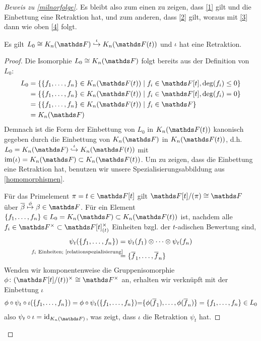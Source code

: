 \documentclass[ngerman,fontsize=11pt, paper=a4, parskip=half, titlepage=true, toc=bib]{scrartcl}
\begin{document}
\begin{proof}[Beweis zu \ref{milnorfolge}]
  Es bleibt also zum einen zu zeigen, dass \eqref{1} gilt und die Einbettung eine
  Retraktion hat, und zum anderen, dass \eqref{2} gilt, woraus mit \eqref{3} dann wie
  oben \eqref{4} folgt.
  
  \begin{Lem}
    Es gilt $L_0\cong \KnF\overset{\iota}{\hookrightarrow} \KnFt$
    und $\iota$ hat eine Retraktion.
    \begin{proof}
      Die Isomorphie $L_0\cong\KnF$ folgt bereits aus der Definition
      von $L_0$:
      \begin{align*}
        L_0
        &=\left\{\{f_1,\dotsc,f_n\}\in\KnFt 
          \mid f_i\in\F[t], \deg(f_i)\leq 0\right\}\\
        &=\left\{\{f_1,\dotsc,f_n\}\in\KnFt 
          \mid f_i\in\F[t], \deg(f_i)= 0\right\}\\
        &=\left\{\{f_1,\dotsc,f_n\}\in\KnFt 
          \mid f_i\in\F\right\}\\
        &=\KnF
      \end{align*}
      Demnach ist die Form der Einbettung von $L_0$ in $\KnFt$
      kanonisch gegeben durch die Einbettung von $\KnF$ in $\KnFt$, 
      d.h. $L_0=\KnF\overset{\iota}{\hookrightarrow}\KnFt$ 
      mit $\im(\iota)=\KnF\subset\KnFt$.
      Um zu zeigen, dass die Einbettung eine Retraktion hat,
      benutzen wir unsere Spezialisierungsabbildung aus 
      \ref{homomorphismen}.
      
      Für das Primelement $\pi=t\in\F[t]$ gilt $\F[t]/(\pi)\cong\F$
      über $\ov\beta\overset{\phi}{\mapsto}\beta\in\F$.
      Für ein Element $\{f_1,\dotsc, f_n\}\in L_0=\KnF\subset\KnFt$ ist,
      nachdem alle $f_i\in\Fx\subset\F[t]_{(t)}^\times$ Einheiten 
      bzgl. der $t$-adischen Bewertung sind,
      \begin{align*}
        \psi_t(\{f_1,\dotsc,f_n\})
        &={\psi_t(f_1)} \otimes\dotsb\otimes {\psi_t(f_n)}\\
        &\overset{\mathllap{\text{$f_i$ Einheiten; 
          \ref{relationspezialisierung}}}}{=}
          \{\ov f_1,\dotsc, \ov f_n\}
      \end{align*}
      Wenden wir komponentenweise die Gruppenisomorphie 
      $\phi\colon(\F[t]/(t))^\times\cong\Fx$ an, 
      erhalten wir verknüpft mit der Einbettung $\iota$
      \begin{align*}
        \phi\circ\psi_t\circ\iota(\{f_1,\dotsc,f_n\})
        =\phi\circ\psi_t(\{f_1,\dotsc,f_n\})
        {=}\{\phi(\overline f_1),\dotsc, \phi(\overline f_n)\}
        =\{f_1,\dotsc,f_n\}\in L_0
      \end{align*}
      also $\psi_t\circ \iota=\id_{\KnF}$, was zeigt, dass
      $\iota$ die Retraktion $\psi_t$ hat.
    \end{proof}
  \end{Lem}
  

\end{proof}
\end{document}
